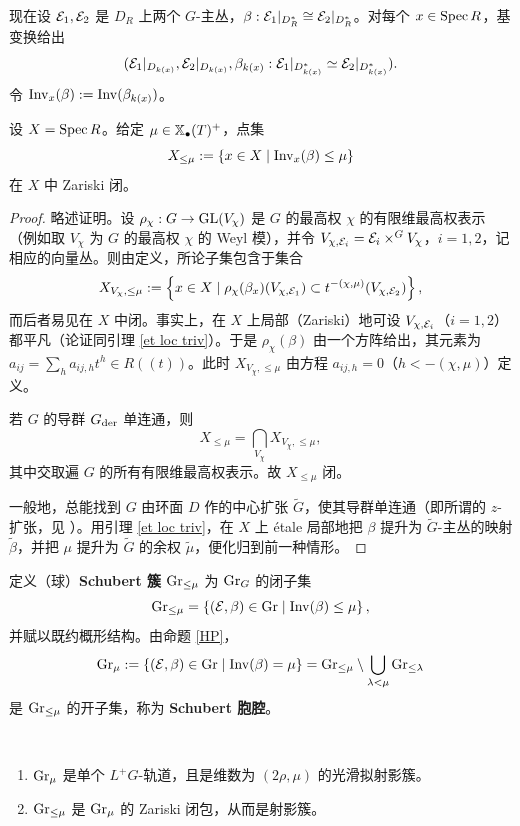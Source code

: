 现在设 ${\mathcal E}_1,{\mathcal E}_2$ 是 $D_R$ 上两个 $G$-主丛，$\beta: {\mathcal E}_1|_{D_R^*}\cong {\mathcal E}_2|_{D_R^*}$。对每个 $x\in \operatorname{Spec} R$，基变换给出
\[({\mathcal E}_1|_{D_{k(x)}},{\mathcal E}_2|_{D_{k(x)}},\beta_{k(x)}: {\mathcal E}_1|_{D_{k(x)}^*}\simeq {\mathcal E}_2|_{D_{k(x)}^*}).\]
令 ${\operatorname{Inv}}_x(\beta):={\operatorname{Inv}}(\beta_{k(x)})$。

\begin{prop}\label{HP}
设 $X=\operatorname{Spec} R$。给定 $\mu\in\mathbb{X}_\bullet(T)^+$，点集
\[X_{\leq \mu}:=\left\{x\in X\mid {\operatorname{Inv}}_x(\beta)\leq \mu\right\}\]
在 $X$ 中 Zariski 闭。
\end{prop}

\begin{proof}
略述证明。设 $\rho_\chi: G\to {\operatorname{GL}}(V_\chi)$ 是 $G$ 的最高权 $\chi$ 的有限维最高权表示（例如取 $V_\chi$ 为 $G$ 的最高权 $\chi$ 的 Weyl 模），并令 $V_{\chi,{\mathcal E}_i}={\mathcal E}_i\times^GV_{\chi}$，$i=1,2$，记相应的向量丛。则由定义，所论子集包含于集合
\[X_{V_\chi,\leq \mu}:=\left\{x\in X\mid\rho_\chi(\beta_x)(V_{\chi,{\mathcal E}_1})\subset t^{-(\chi,\mu)}(V_{\chi,{\mathcal E}_2})\right\},\]
而后者易见在 $X$ 中闭。事实上，在 $X$ 上局部（Zariski）地可设 $V_{\chi,{\mathcal E}_i}$（$i=1,2$）都平凡（论证同引理 \ref{et loc triv}）。于是 $\rho_\chi(\beta)$ 由一个方阵给出，其元素为 $a_{ij}=\sum_h a_{ij,h}t^h\in R((t))$。此时 $X_{V_\chi,\leq \mu}$ 由方程 $a_{ij,h}=0$（$h<-(\chi,\mu)$）定义。

若 $G$ 的导群 $G_{\operatorname{der}}$ 单连通，则
\[X_{\leq \mu}=\bigcap_{V_\chi} X_{V_\chi,\leq \mu},\]
其中交取遍 $G$ 的所有有限维最高权表示。故 $X_{\leq \mu}$ 闭。

一般地，总能找到 $G$ 由环面 $D$ 作的中心扩张 $\tilde G$，使其导群单连通（即所谓的 $z$-扩张，见 \cite[Proposition 3.1]{MS}）。用引理 \ref{et loc triv}，在 $X$ 上 \'etale 局部地把 $\beta$ 提升为 $\tilde G$-主丛的映射 $\tilde \beta$，并把 $\mu$ 提升为 $\tilde G$ 的余权 $\tilde \mu$，便化归到前一种情形。
\end{proof}

定义（球）\textbf{Schubert 簇} ${\operatorname{Gr}}_{\leq \mu}$ 为 ${\operatorname{Gr}}_G$ 的闭子集
\[{\operatorname{Gr}}_{\leq \mu}=\left\{({\mathcal E},\beta)\in {\operatorname{Gr}}\mid {\operatorname{Inv}}(\beta)\leq \mu\right\},\]
并赋以既约概形结构。由命题 \ref{HP}，
\[{\operatorname{Gr}}_\mu:=\left\{({\mathcal E},\beta)\in {\operatorname{Gr}}\mid {\operatorname{Inv}}(\beta)=\mu\right\}={\operatorname{Gr}}_{\leq \mu}\setminus \bigcup_{{\lambda}<\mu}{\operatorname{Gr}}_{\leq {\lambda}}\]
是 ${\operatorname{Gr}}_{\leq \mu}$ 的开子集，称为 \textbf{Schubert 胞腔}。

\begin{prop}\label{geom of Sch}~
\begin{enumerate}
\item ${\operatorname{Gr}}_{\mu}$ 是单个 $L^+G$-轨道，且是维数为 $(2\rho,\mu)$ 的光滑拟射影簇。
\item ${\operatorname{Gr}}_{\leq \mu}$ 是 ${\operatorname{Gr}}_\mu$ 的 Zariski 闭包，从而是射影簇。
\end{enumerate}
\end{prop}

